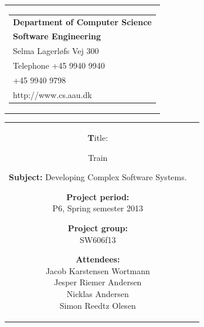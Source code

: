 \thispagestyle{empty}
\begin{titlingpage}
\begin{nopagebreak}
\setcounter{page}{3}
{\samepage 
\begin{tabular}{r}
\parbox{\textwidth}{  
\hfill \parbox{4.9cm}{\begin{tabular}{l}
{\textsf{\small \textbf{Department of Computer Science}}}\\
{\textsf{\small  \textbf{Software Engineering}}} \\
{\textsf{\small Selma Lagerløfs Vej 300}} \\
{\textsf{\small Telephone +45 9940 9940}} \\
{\textsf{\small +45 9940 9798}} \\
{\textsf{\small http://www.cs.aau.dk}}
\end{tabular}}}
\\
\end{tabular}

\begin{tabular}{cc}
\parbox{6cm}{
\begin{description}

\item {\textbf Title:} 

Train
  
\item {\textbf{Subject:}} 
Developing Complex Software Systems.

\end{description}

\parbox{8cm}{

\begin{description}
\item {\textbf{Project period:}}\\
   P6, Spring semester 2013\\
  \hspace{4cm}
\item {\textbf{Project group:}}\\
  SW606f13\\
  \hspace{4cm}
\item {\textbf{Attendees:}}\\
Jacob Karstensen Wortmann \\
Jesper Riemer Andersen \\
Nicklas Andersen \\
Simon Reedtz Olesen \\


\end{description}}}
\end{tabular}}
\end{nopagebreak}
\end{titlingpage}
